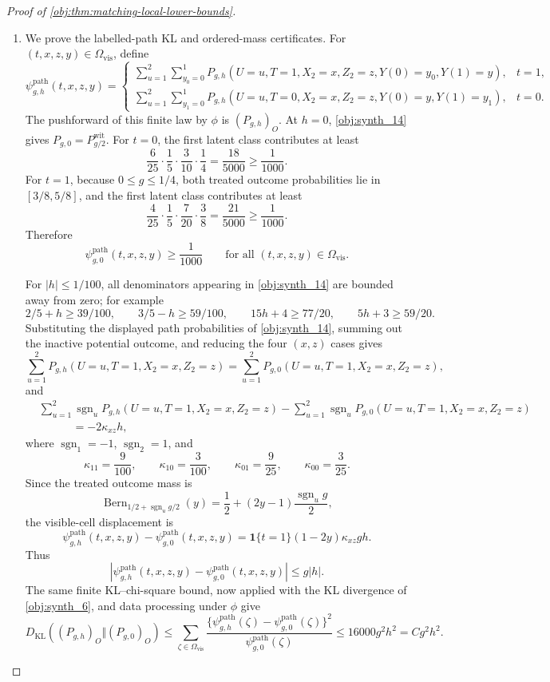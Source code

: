 \begin{proof}[Proof of \cref{obj:thm:matching-local-lower-bounds}]
\begin{enumerate}
\item We prove the labelled-path KL and ordered-mass certificates.  For \((t,x,z,y)\in\Omega_{\mathrm{vis}}\), define
\[
\psi^{\mathrm{path}}_{g,h}(t,x,z,y)
=
\begin{cases}
\displaystyle
\sum_{u=1}^{2}\sum_{y_0=0}^{1}
P_{g,h}(U=u,T=1,X_2=x,Z_2=z,Y(0)=y_0,Y(1)=y),
& t=1,\\[1.2em]
\displaystyle
\sum_{u=1}^{2}\sum_{y_1=0}^{1}
P_{g,h}(U=u,T=0,X_2=x,Z_2=z,Y(0)=y,Y(1)=y_1),
& t=0.
\end{cases}
\]
The pushforward of this finite law by \(\phi\) is \((P_{g,h})_O\).  At \(h=0\), \cref{obj:synth_14} gives \(P_{g,0}=P_{g/2}^{\mathrm{wit}}\).  For \(t=0\), the first latent class contributes at least
\[
\frac6{25}\cdot\frac15\cdot\frac3{10}\cdot\frac14
=
\frac{18}{5000}
\ge
\frac1{1000}.
\]
For \(t=1\), because \(0\le g\le1/4\), both treated outcome probabilities lie in \([3/8,5/8]\), and the first latent class contributes at least
\[
\frac4{25}\cdot\frac15\cdot\frac7{20}\cdot\frac38
=
\frac{21}{5000}
\ge
\frac1{1000}.
\]
Therefore
\[
\psi^{\mathrm{path}}_{g,0}(t,x,z,y)\ge\frac1{1000}
\qquad
\text{for all }(t,x,z,y)\in\Omega_{\mathrm{vis}} .
\]

For \(|h|\le1/100\), all denominators appearing in \cref{obj:synth_14} are bounded away from zero; for example
\[
2/5+h\ge39/100,\qquad
3/5-h\ge59/100,\qquad
15h+4\ge77/20,\qquad
5h+3\ge59/20 .
\]
Substituting the displayed path probabilities of \cref{obj:synth_14}, summing out the inactive potential outcome, and reducing the four \((x,z)\) cases gives
\[
\sum_{u=1}^{2}P_{g,h}(U=u,T=1,X_2=x,Z_2=z)
=
\sum_{u=1}^{2}P_{g,0}(U=u,T=1,X_2=x,Z_2=z),
\]
and
\[
\begin{aligned}
&\sum_{u=1}^{2}\operatorname{sgn}_u
P_{g,h}(U=u,T=1,X_2=x,Z_2=z)
-
\sum_{u=1}^{2}\operatorname{sgn}_u
P_{g,0}(U=u,T=1,X_2=x,Z_2=z)  \\
&\hspace{3em}=
-2\kappa_{xz}h,
\end{aligned}
\]
where \(\operatorname{sgn}_1=-1\), \(\operatorname{sgn}_2=1\), and
\[
\kappa_{11}=\frac9{100},\qquad
\kappa_{10}=\frac3{100},\qquad
\kappa_{01}=\frac9{25},\qquad
\kappa_{00}=\frac3{25}.
\]
Since the treated outcome mass is
\[
\operatorname{Bern}_{1/2+\operatorname{sgn}_u g/2}(y)
=
\frac12+(2y-1)\frac{\operatorname{sgn}_u g}{2},
\]
the visible-cell displacement is
\[
\psi^{\mathrm{path}}_{g,h}(t,x,z,y)-\psi^{\mathrm{path}}_{g,0}(t,x,z,y)
=
\mathbf 1\{t=1\}(1-2y)\kappa_{xz}gh .
\]
Thus
\[
\left|\psi^{\mathrm{path}}_{g,h}(t,x,z,y)-\psi^{\mathrm{path}}_{g,0}(t,x,z,y)\right|
\le g|h|.
\]
The same finite KL--chi-square bound, now applied with the KL divergence of \cref{obj:synth_6}, and data processing under \(\phi\) give
\[
D_{\mathrm{KL}}\!\left((P_{g,h})_O\Vert(P_{g,0})_O\right)
\le
\sum_{\zeta\in\Omega_{\mathrm{vis}}}
\frac{\{\psi^{\mathrm{path}}_{g,h}(\zeta)-\psi^{\mathrm{path}}_{g,0}(\zeta)\}^2}
{\psi^{\mathrm{path}}_{g,0}(\zeta)}
\le
16000g^2h^2
=
C g^2h^2.
\]


\end{enumerate}
\end{proof}
